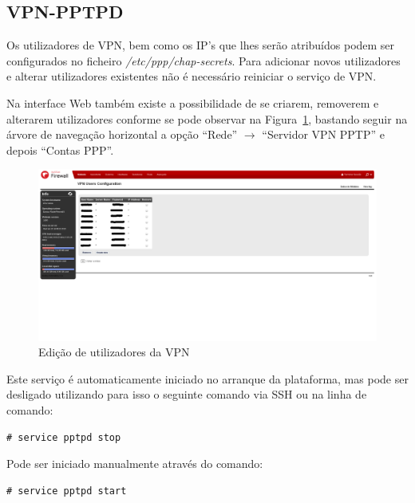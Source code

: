 \subsection{VPN-PPTPD}

Os utilizadores de VPN, bem como os IP's que lhes serão atribuídos podem ser
configurados no ficheiro \emph{/etc/ppp/chap-secrets}.
Para adicionar novos utilizadores e alterar utilizadores existentes não é necessário
reiniciar o serviço de VPN.

Na interface Web também existe a possibilidade de se criarem, removerem e alterarem
utilizadores conforme se pode observar na Figura~\ref{fig:vpn}, bastando seguir na árvore de navegação horizontal a opção ``Rede'' $\rightarrow$ ``Servidor VPN PPTP'' e depois ``Contas PPP''.

\begin{figure}[H]
\begin{center}
\includegraphics[width=15cm]{include/img/vpn}
\end{center}
\caption{Edição de utilizadores da VPN}
\label{fig:vpn}
\end{figure}

Este serviço é automaticamente iniciado no arranque da plataforma, mas pode ser desligado utilizando para isso o seguinte comando via SSH ou na linha de comando:

\begin{verbatim}
# service pptpd stop
\end{verbatim}

Pode ser iniciado manualmente através do comando:

\begin{verbatim}
# service pptpd start
\end{verbatim}
